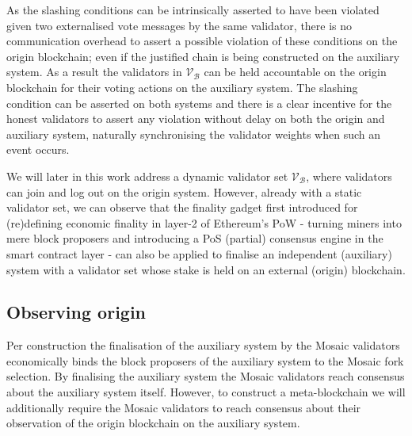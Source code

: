 \documentclass[12pt,a4paper]{article}
\begin{document}
As the slashing conditions can be intrinsically asserted to have been violated given two externalised vote messages by the same validator, there is no communication overhead to assert a possible violation of these conditions on the origin blockchain; even if the justified chain is being constructed on the auxiliary system.  As a result the validators in $\mathcal{V}_\mathcal{B}$ can be held accountable on the origin blockchain for their voting actions on the auxiliary system. The slashing condition can be asserted on both systems and there is a clear incentive for the honest validators to assert any violation without delay on both the origin and auxiliary system, naturally synchronising the validator weights when such an event occurs.

We will later in this work address a dynamic validator set $\mathcal{V}_\mathcal{B}$, where validators can join and log out on the origin system. However, already with a static validator set, we can observe that the finality gadget first introduced for (re)defining economic finality in layer-2 of Ethereum's PoW - turning miners into mere block proposers and introducing a PoS (partial) consensus engine in the smart contract layer - can also be applied to finalise an independent (auxiliary) system with a validator set whose stake is held on an external (origin) blockchain.


\subsection{Observing origin}
\label{observing_origin}

Per construction the finalisation of the auxiliary system by the Mosaic validators economically binds the block proposers of the auxiliary system to the Mosaic fork selection. By finalising the auxiliary system the Mosaic validators reach consensus about the auxiliary system itself. However, to construct a meta-blockchain we will additionally require the Mosaic validators to reach consensus about their observation of the origin blockchain on the auxiliary system.
\end{document}
